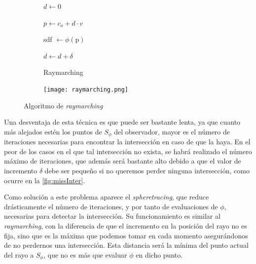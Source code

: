 \begin{figure}[ht!]
    \centering
    \begin{subfigure}[b]{0.58\textwidth}
        \begin{algorithm}[H]
            \caption{Raymarching}
                
                $d \gets 0$ 
                
                 {
                    $p \gets c_o +d\cdot v$
                    
                    sdf $\gets \phi(\text{p})$
                    
            
                    $d\gets d + \delta$\;
            
                }
        \end{algorithm}
    \end{subfigure}%
    \hfill
    \begin{subfigure}[b]{0.4\textwidth}
        \texttt{[image: raymarching.png]}
    \end{subfigure}
    \caption{Algoritmo de \textit{raymarching}}
    \label{a:raymarching}
\end{figure}

Una desventaja de esta técnica es que puede ser bastante lenta, ya que cuanto más alejados estén los puntos de $S_\phi$ del observador, mayor es el número de iteraciones necesarias para encontrar la intersección en caso de que la haya. En el peor de los casos en el que tal intersección no exista, se habrá realizado el número máximo de iteraciones, que además será bastante alto debido a que el valor de incremento $\delta$ debe ser pequeño si no queremos perder ninguna intersección, como ocurre en la \autoref{fig:missInter}.\newline

Como solución a este problema aparece el \textit{spheretracing}, que reduce drásticamente el número de iteraciones, y por tanto de evaluaciones de $\phi$, necesarias para detectar la intersección. Su funcionamiento es similar al \textit{raymarching}, con la diferencia de que el incremento en la posición del rayo no es fija, sino que es la máxima que podemos tomar en cada momento asegurándonos de no perdernos una intersección. Esta distancia será la mínima del punto actual del rayo a $S_\phi$, que no es más que evaluar $\phi$ en dicho punto.\newline

